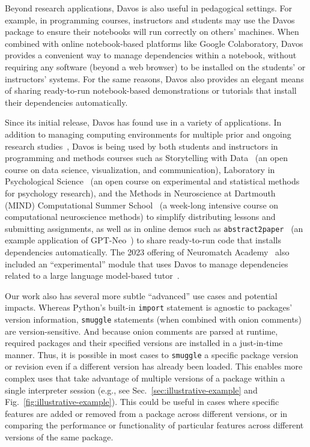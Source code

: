 \documentclass[preprint,12pt,a4paper]{elsarticle}
\begin{document}
Beyond research applications, Davos is also useful in
pedagogical settings. For example, in programming courses, instructors
and students may use the Davos package to ensure their
notebooks will run correctly on others' machines. When combined with
online notebook-based platforms like Google Colaboratory,
Davos provides a convenient way to manage dependencies within
a notebook, without requiring any software (beyond a web browser) to
be installed on the students' or instructors' systems. For the same
reasons, Davos also provides an elegant means of sharing
ready-to-run notebook-based demonstrations or tutorials that install
their dependencies automatically.

Since its initial release, Davos has found use in a variety of applications. In
addition to managing computing environments for multiple prior and ongoing
research studies~\citep{MannEtal23a, OwenMann23, ZimaEtal23}, Davos is being
used by both students and instructors in programming and methods courses such
as Storytelling with Data~\cite{Mann21a} (an open course on data science,
visualization, and communication), Laboratory in Psychological
Science~\cite{Mann22} (an open course on experimental and statistical methods
for psychology research), and the Methods in Neuroscience at Dartmouth (MIND)
Computational Summer School~\cite{MIND23} (a week-long intensive course on
computational neuroscience methods) to simplify distributing lessons
and submitting assignments, as well as in online demos such as
\texttt{abstract2paper}~\cite{Mann21b} (an example application of
GPT-Neo~\cite{GaoEtal20, BlacEtal21}) to share ready-to-run code that installs
dependencies automatically. The 2023 offering of Neuromatch
Academy~\cite{vanVEtal21} also included an ``experimental'' module that uses
Davos to manage dependencies related to a large language model-based
tutor~\cite{MannEtal23b}.

Our work also has several more subtle ``advanced'' use cases and potential
impacts. Whereas Python's built-in \texttt{import} statement is agnostic to
packages' version information, \texttt{smuggle} statements (when combined with
onion comments) are version-sensitive. And because onion comments are parsed at
runtime, required packages and their specified versions are installed in a
just-in-time manner. Thus, it is possible in most cases to \texttt{smuggle} a
specific package version or revision even if a different version has already
been loaded. This enables more complex uses that take advantage of multiple
versions of a package within a single interpreter session (e.g., see
Sec.~\ref{sec:illustrative-example} and Fig.~\ref{fig:illustrative-example}).
This could be useful in cases where specific features are added or removed from
a package across different versions, or in comparing the performance or
functionality of particular features across different versions of the same
package.
\end{document}
